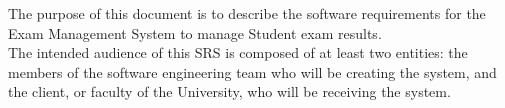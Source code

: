 The purpose of this document is to describe the software requirements for the Exam Management System to manage Student exam results.
\\
The intended audience of this SRS is composed of at least two entities: the members of the software engineering team who will be creating the system, and the client, or faculty of the University, who will be receiving the system.
